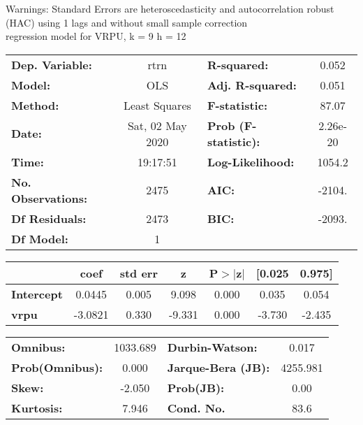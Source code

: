 Warnings: \newline
 [1] Standard Errors are heteroscedasticity and autocorrelation robust (HAC) using 1 lags and without small sample correction\\ 

regression model for VRPU, k = 9 h = 12\begin{center}
\begin{tabular}{lclc}
\toprule
\textbf{Dep. Variable:}    &       rtrn       & \textbf{  R-squared:         } &     0.052   \\
\textbf{Model:}            &       OLS        & \textbf{  Adj. R-squared:    } &     0.051   \\
\textbf{Method:}           &  Least Squares   & \textbf{  F-statistic:       } &     87.07   \\
\textbf{Date:}             & Sat, 02 May 2020 & \textbf{  Prob (F-statistic):} &  2.26e-20   \\
\textbf{Time:}             &     19:17:51     & \textbf{  Log-Likelihood:    } &    1054.2   \\
\textbf{No. Observations:} &        2475      & \textbf{  AIC:               } &    -2104.   \\
\textbf{Df Residuals:}     &        2473      & \textbf{  BIC:               } &    -2093.   \\
\textbf{Df Model:}         &           1      & \textbf{                     } &             \\
\bottomrule
\end{tabular}
\begin{tabular}{lcccccc}
                   & \textbf{coef} & \textbf{std err} & \textbf{z} & \textbf{P$> |$z$|$} & \textbf{[0.025} & \textbf{0.975]}  \\
\midrule
\textbf{Intercept} &       0.0445  &        0.005     &     9.098  &         0.000        &        0.035    &        0.054     \\
\textbf{vrpu}      &      -3.0821  &        0.330     &    -9.331  &         0.000        &       -3.730    &       -2.435     \\
\bottomrule
\end{tabular}
\begin{tabular}{lclc}
\textbf{Omnibus:}       & 1033.689 & \textbf{  Durbin-Watson:     } &    0.017  \\
\textbf{Prob(Omnibus):} &   0.000  & \textbf{  Jarque-Bera (JB):  } & 4255.981  \\
\textbf{Skew:}          &  -2.050  & \textbf{  Prob(JB):          } &     0.00  \\
\textbf{Kurtosis:}      &   7.946  & \textbf{  Cond. No.          } &     83.6  \\
\bottomrule
\end{tabular}
\end{center}

